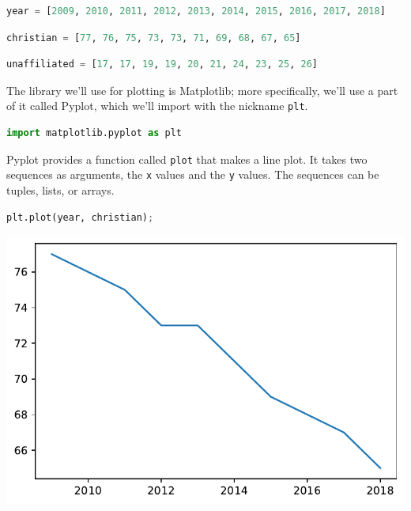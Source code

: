 \begin{lstlisting}[language=Python]
year = [2009, 2010, 2011, 2012, 2013, 2014, 2015, 2016, 2017, 2018]
\end{lstlisting}

\begin{lstlisting}[language=Python]
christian = [77, 76, 75, 73, 73, 71, 69, 68, 67, 65]
\end{lstlisting}

\begin{lstlisting}[language=Python]
unaffiliated = [17, 17, 19, 19, 20, 21, 24, 23, 25, 26]
\end{lstlisting}

The library we'll use for plotting is Matplotlib; more specifically,
we'll use a part of it called Pyplot, which we'll import with the
nickname \passthrough{\lstinline!plt!}.

\begin{lstlisting}[language=Python]
import matplotlib.pyplot as plt
\end{lstlisting}

Pyplot provides a function called \passthrough{\lstinline!plot!} that
makes a line plot. It takes two sequences as arguments, the
\passthrough{\lstinline!x!} values and the \passthrough{\lstinline!y!}
values. The sequences can be tuples, lists, or arrays.

\begin{lstlisting}[language=Python]
plt.plot(year, christian);
\end{lstlisting}

\begin{center}
\includegraphics[scale=0.75]{chapters/06_plotting_files/06_plotting_25_0.pdf}
\end{center}

